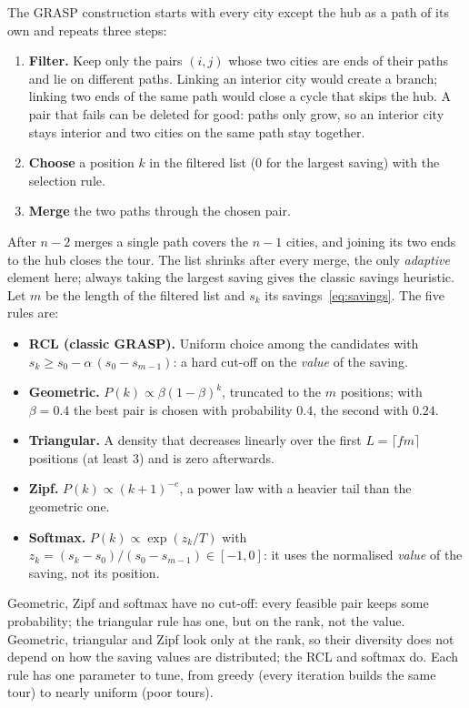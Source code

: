 \documentclass[10pt,a4paper]{article}
\begin{document}
The GRASP construction starts with every city except the hub as a path of its own and repeats three steps:
\begin{enumerate}
\item \textbf{Filter.} Keep only the pairs $(i,j)$ whose two cities are ends of their paths and lie on
different paths. Linking an interior city would create a branch; linking two ends of the same path
would close a cycle that skips the hub. A pair that fails can be deleted for good: paths only grow,
so an interior city stays interior and two cities on the same path stay together.
\item \textbf{Choose} a position $k$ in the filtered list (0 for the largest saving) with the
selection rule.
\item \textbf{Merge} the two paths through the chosen pair.
\end{enumerate}
After $n-2$ merges a single path covers the $n-1$ cities, and joining its two ends to the hub closes
the tour. The list shrinks after every merge, the only \emph{adaptive} element here; always taking
the largest saving gives the classic savings heuristic. Let $m$ be the length of the filtered list and
$s_k$ its savings~\eqref{eq:savings}. The five rules are:
\begin{itemize}
\item \textbf{RCL (classic GRASP).} Uniform choice among the candidates with
$s_k\ge s_0-\alpha\,(s_0-s_{m-1})$: a hard cut-off on the \emph{value} of the saving.
\item \textbf{Geometric.} $P(k)\propto\beta(1-\beta)^k$, truncated to the $m$ positions; with
$\beta=0.4$ the best pair is chosen with probability $0.4$, the second with $0.24$.
\item \textbf{Triangular.} A density that decreases linearly over the first $L=\lceil f m\rceil$
positions (at least 3) and is zero afterwards.
\item \textbf{Zipf.} $P(k)\propto(k+1)^{-e}$, a power law with a heavier tail than the geometric one.
\item \textbf{Softmax.} $P(k)\propto\exp(z_k/T)$ with $z_k=(s_k-s_0)/(s_0-s_{m-1})\in[-1,0]$: it uses
the normalised \emph{value} of the saving, not its position.
\end{itemize}
Geometric, Zipf and softmax have no cut-off: every feasible pair keeps some probability; the triangular rule has one, but on the rank, not the value. Geometric, triangular and Zipf look only at the rank, so their diversity does not
depend on how the saving values are distributed; the RCL and softmax do. Each rule has one parameter to tune, from
greedy (every iteration builds the same tour) to nearly uniform (poor tours).
\end{document}
